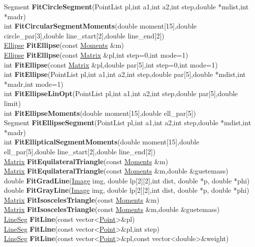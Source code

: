 \documentclass[10pt,titlepage]{article}
\def\functionlistentry#1#2#3#4#5#6{\noindent #1 {\bf #2}(#3) \dotfill #6\\}
\begin{document}
{{\functionlistentry{Segment}{FitCircleSegment}{PointList pl,int a1,int a2,int step,double *mdist,int *madr}{1182}{fitting}{}
\functionlistentry{int}{FitCircularSegmentMoments}{double moment[15],double circle\_par[3],double line\_start[2],double line\_end[2]}{1628}{obsolet}{}
\functionlistentry{\hyperlink{Ellipse}{Ellipse}}{FitEllipse}{const \hyperlink{Moments}{Moments} \&m}{856}{moments}{}
\functionlistentry{\hyperlink{Ellipse}{Ellipse}}{FitEllipse}{const \hyperlink{Matrix}{Matrix} \&pl,int step=0,int mode=1}{1177}{fitting}{}
\functionlistentry{int}{FitEllipse}{const \hyperlink{Matrix}{Matrix} \&pl,double par[5],int step=0,int mode=1}{1178}{fitting}{}
\functionlistentry{int}{FitEllipse}{PointList pl,int a1,int a2,int step,double par[5],double *mdist,int *madr,int mode=1}{1179}{fitting}{}
\functionlistentry{int}{FitEllipseLinOpt}{PointList pl,int a1,int a2,int step,double par[5],double limit}{1180}{fitting}{}
\functionlistentry{int}{FitEllipseMoments}{double moment[15],double ell\_par[5]}{1629}{obsolet}{}
\functionlistentry{Segment}{FitEllipseSegment}{PointList pl,int a1,int a2,int step,double *mdist,int *madr}{1183}{fitting}{}
\functionlistentry{int}{FitEllipticalSegmentMoments}{double moment[15],double ell\_par[5],double line\_start[2],double line\_end[2]}{1630}{obsolet}{}
\functionlistentry{\hyperlink{Matrix}{Matrix}}{FitEquilateralTriangle}{const \hyperlink{Moments}{Moments} \&m}{841}{moments}{}
\functionlistentry{\hyperlink{Matrix}{Matrix}}{FitEquilateralTriangle}{const \hyperlink{Moments}{Moments} \&m,double \&guetemass}{842}{moments}{}
\functionlistentry{double}{FitGradLine}{\hyperlink{Image}{Image} img, double lp[2][2],int dist, double *p, double *phi}{1192}{fitting}{}
\functionlistentry{double}{FitGrayLine}{\hyperlink{Image}{Image} img, double lp[2][2],int dist, double *p, double *phi}{1191}{fitting}{}
\functionlistentry{\hyperlink{Matrix}{Matrix}}{FitIsoscelesTriangle}{const \hyperlink{Moments}{Moments} \&m}{843}{moments}{}
\functionlistentry{\hyperlink{Matrix}{Matrix}}{FitIsoscelesTriangle}{const \hyperlink{Moments}{Moments} \&m,double \&guetemass}{844}{moments}{}
\functionlistentry{\hyperlink{LineSeg}{LineSeg}}{FitLine}{const vector\textless {}\hyperlink{Point}{Point}\textgreater  \&pl}{1159}{fitting}{}
\functionlistentry{\hyperlink{LineSeg}{LineSeg}}{FitLine}{const vector\textless {}\hyperlink{Point}{Point}\textgreater  \&pl,int step}{1160}{fitting}{}
\functionlistentry{\hyperlink{LineSeg}{LineSeg}}{FitLine}{const vector\textless {}\hyperlink{Point}{Point}\textgreater  \&pl,const vector\textless {}double\textgreater  \&weight}{1161}{fitting}{}
}}
\end{document}
